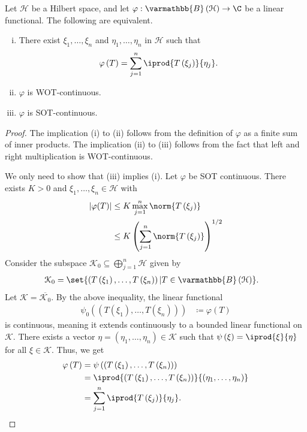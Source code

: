 \documentclass[10pt]{mypackage}
\renewcommand*{\mathbb}[1]{\varmathbb{#1}}
\newcommand{\B}{\mathbb{B}}
\begin{document}
\begin{proposition}
  Let $\mathcal{H}$ be a Hilbert space, and let $\varphi: \B\left(\mathcal{H}\right)\rightarrow \C$ be a linear functional. The following are equivalent.
  \begin{enumerate}[(i)]
    \item There exist $\xi_1,\dots,\xi_n$ and $\eta_1,\dots,\eta_n$ in $\mathcal{H}$ such that
      \begin{align*}
        \varphi\left(T\right) &= \sum_{j=1}^{n} \iprod{T\left(\xi_j\right)}{\eta_j}.
      \end{align*}
    \item $\varphi$ is WOT-continuous.
    \item $\varphi$ is SOT-continuous.
  \end{enumerate}
\end{proposition}
\begin{proof}
  The implication (i) to (ii) follows from the definition of $\varphi$ as a finite sum of inner products. The implication (ii) to (iii) follows from the fact that left and right multiplication is WOT-continuous.\newline

  We only need to show that (iii) implies (i). Let $\varphi$ be SOT continuous. There exists $K > 0$ and $\xi_1,\dots,\xi_n\in \mathcal{H}$ with
  \begin{align*}
    \left\vert \varphi(T) \right\vert &\leq K\max_{j=1}^{n}\norm{T\left(\xi_j\right)}\\
                                      &\leq K \left(\sum_{j=1}^{n}\norm{T\left(\xi_j\right)}\right)^{1/2}
  \end{align*}
  Consider the subspace $\mathcal{K}_0\subseteq \bigoplus_{j=1}^{n}\mathcal{H}$ given by
  \begin{align*}
    \mathcal{K}_0 &= \set{\left(T\left(\xi_1\right),\dots,T\left(\xi_n\right)\right) | T\in \B\left(\mathcal{H}\right)}.
  \end{align*}
  Let $\mathcal{K} = \overline{\mathcal{K}_0}$. By the above inequality, the linear functional
  \begin{align*}
    \psi_0\left(\left(T\left(\xi_1\right),\dots,T\left(\xi_n\right)\right)\right) &\coloneq \varphi(T)
  \end{align*}
  is continuous, meaning it extends continuously to a bounded linear functional on $\mathcal{K}$. There exists a vector $\eta = \left(\eta_1,\dots,\eta_n\right)\in \mathcal{K}$ such that $\psi\left(\xi\right) = \iprod{\xi}{\eta}$ for all $\xi\in \mathcal{K}$. Thus, we get
  \begin{align*}
    \varphi\left(T\right) &= \psi\left(\left(T\left(\xi_1\right),\dots,T\left(\xi_n\right)\right)\right)\\
                          &= \iprod{\left(T\left(\xi_1\right),\dots,T\left(\xi_n\right)\right)}{\left(\eta_1,\dots,\eta_n\right)}\\
                          &= \sum_{j=1}^{n} \iprod{T\left(\xi_j\right)}{\eta_j}.
  \end{align*}
\end{proof}
\end{document}
